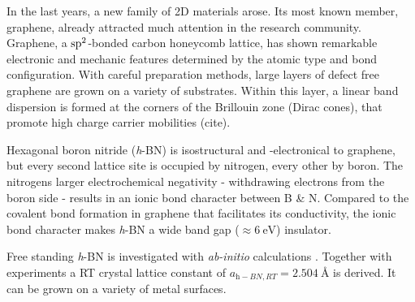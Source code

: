
In the last years, a new family of 2D materials arose. Its most known member, graphene, already attracted much attention in the research community. Graphene, a $\textnormal{sp}^2$-bonded carbon honeycomb lattice, has shown remarkable electronic and mechanic features determined by the atomic type and bond configuration. With careful preparation methods, large layers of defect free graphene are grown on a variety of substrates. Within this layer, a linear band dispersion is formed at the corners of the Brillouin zone (Dirac cones), that promote high charge carrier mobilities (cite).

Hexagonal boron nitride (\textit{h}-BN) is isostructural and -electronical to graphene, but every second lattice site is occupied by nitrogen, every other by boron. The nitrogens larger electrochemical negativity - withdrawing electrons from the boron side - results in an ionic bond character between B \& N. Compared to the covalent bond formation in graphene that facilitates its conductivity, the ionic bond character makes \textit{h}-BN a wide band gap ($\approx \SI{6}{\eV}$) insulator. \cite{watanabe_direct-bandgap_2004, cassabois_hexagonal_2016, blase_quasiparticle_1995} 

Free standing \textit{h}-BN is investigated with \textit{ab-initio} calculations \cite{han_effects_2014,mortazavi_investigation_2012,topsakal_first-principles_2009,peng_mechanical_2012}. Together with experiments \cite{paszkowicz_lattice_2002} a RT crystal lattice constant of $a_{\textit{h}-BN, RT}=\SI{2.504}{\angstrom}$ is derived.  It can be grown on a variety of metal surfaces.\cite{muller_epitaxial_2010,muller_one-dimensional_2008,guo_controllable_2012-4,siegel_heterogeneous_2017,schwarz_corrugation_2017,joshi_boron_2012,preobrajenski_monolayer_2005,vinogradov_one-dimensional_2012,farwick_zum_hagen_structure_2016,schulz_epitaxial_2014,Schulz_Templated_2013,gomez_diaz_hexagonal_2013,usachov_experimental_2012,orlando_epitaxial_2012,preobrajenski_monolayer_2007-1,preobrajenski_monolayer_2005,auwarter_synthesis_2004-1,auwarter_xpd_1999,nagashima_electronic_1995,corso_h-bn_2005,morscher_formation_2006,nagashima_electronic_1995,cavar_single_2008,muller_symmetry_2005,nagashima_electronic_1995,gomez_diaz_hexagonal_2013,dong_how_2010,brugger_reversible_2010,preobrajenski_monolayer_2007-1,berner_boron_2007,corso_boron_2004,brugger_comparison_2009,goriachko_self-assembly_2007}


